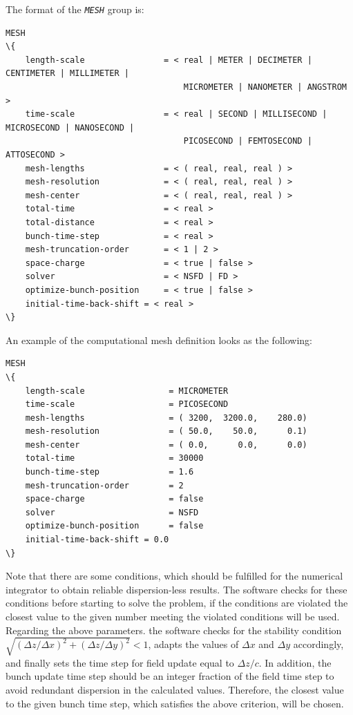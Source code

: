 The format of the {\tt \em \small MESH} group is:
%
\begin{Verbatim}[frame=single, fontsize=\small, tabsize=4, fontfamily=courier, fontseries=b, commandchars=\\\{\}, obeytabs]
MESH
\{
	length-scale				= < real | METER | DECIMETER | CENTIMETER | MILLIMETER | 
									MICROMETER | NANOMETER | ANGSTROM >
	time-scale					= < real | SECOND | MILLISECOND | MICROSECOND | NANOSECOND | 
									PICOSECOND | FEMTOSECOND |	ATTOSECOND >
	mesh-lengths				= < ( real, real, real ) >
	mesh-resolution		 		= < ( real, real, real ) >
	mesh-center				 	= < ( real, real, real ) >
	total-time					= < real >
	total-distance				= < real >
	bunch-time-step		 		= < real >
	mesh-truncation-order 		= < 1 | 2 >
	space-charge  				= < true | false >
	solver						= < NSFD | FD >
	optimize-bunch-position		= < true | false >
	initial-time-back-shift = < real >
\}
\end{Verbatim}
An example of the computational mesh definition looks as the following:
\begin{snugshade}
\begin{Verbatim}[fontsize=\small, tabsize=4, fontfamily=courier, fontseries=b, commandchars=\\\{\}, obeytabs]
MESH
\{
	length-scale 				 = MICROMETER
	time-scale					 = PICOSECOND
	mesh-lengths				 = ( 3200,  3200.0,    280.0)
	mesh-resolution				 = ( 50.0,    50.0,      0.1)
	mesh-center					 = ( 0.0,      0.0,      0.0)
	total-time 					 = 30000
	bunch-time-step				 = 1.6
	mesh-truncation-order		 = 2
	space-charge				 = false
	solver						 = NSFD
	optimize-bunch-position		 = false
	initial-time-back-shift = 0.0
\}
\end{Verbatim}
\end{snugshade}
%
Note that there are some conditions, which should be fulfilled for the numerical integrator to obtain reliable dispersion-less results.
%
The software checks for these conditions before starting to solve the problem, if the conditions are violated the closest value to the given number meeting the violated conditions will be used.
%
Regarding the above parameters. the software checks for the stability condition $\sqrt{(\Delta z/\Delta x)^2+ (\Delta z/\Delta y)^2} < 1$, adapts the values of $\Delta x$ and $\Delta y$ accordingly, and finally sets the time step for field update equal to $\Delta z / c$.
%
In addition, the bunch update time step should be an integer fraction of the field time step to avoid redundant dispersion in the calculated values.
%
Therefore, the closest value to the given bunch time step, which satisfies the above criterion, will be chosen.

